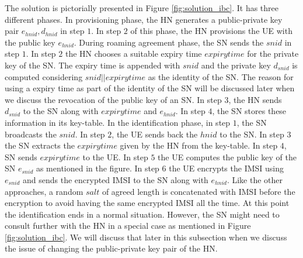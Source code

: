 \documentclass[12pt]{llncs}
\begin{document}
The solution is pictorially presented in Figure \ref{fig:solution_ibc}. It has three different phases. In provisioning phase, the HN generates a public-private key pair $e_{hnid},d_{hnid}$ in step $1$. In step $2$ of this phase, the HN provisions the UE with the public key $e_{hnid}$. During roaming agreement phase, the SN sends the $snid$ in step $1$. In step $2$ the HN chooses a suitable expiry time $expirytime$ for the private key of the SN. The expiry time is appended with $snid$ and the private key $d_{snid}$ is computed considering $snid||expirytime$ as the identity of the SN. The reason for using a expiry time as part of the identity of the SN will be discussed later when we discuss the revocation of the public key of an SN. In step $3$, the HN sends $d_{snid}$ to the SN along with $expirytime$ and $e_{hnid}$. In step $4$, the SN stores these information in its key-table. In the identification phase, in step $1$, the SN broadcasts the $snid$. In step $2$, the UE sends back the $hnid$ to the SN. In step $3$ the SN extracts the $expirytime$ given by the HN from the key-table. In step $4$, SN sends $expirytime$ to the UE. In step $5$ the UE computes the public key of the SN $e_{snid}$ as mentioned in the figure. In step $6$ the UE encrypts the IMSI using $e_{snid}$ and sends the encrypted IMSI to the SN along with $e_{hnid}$. Like the other approaches, a random $salt$ of agreed length is concatenated with IMSI before the encryption to avoid having the same encrypted IMSI all the time. At this point the identification ends in a normal situation. However, the SN might need to consult further with the HN in a special case as mentioned in Figure \ref{fig:solution_ibc}. We will discuss that later in this subsection when we discuss the issue of changing the public-private key pair of the HN. 
\end{document}
